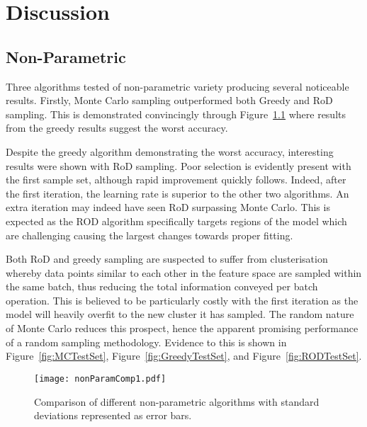 \chapter{Discussion}


\graphicspath{{Chapter5/Figs/Vector/}{Chapter5/Figs/}}


\section{Non-Parametric}
Three algorithms tested of non-parametric variety producing several noticeable results. Firstly, Monte Carlo sampling outperformed both Greedy and RoD sampling. This is demonstrated convincingly through Figure~\ref{fig:nPComp} where results from the greedy results suggest the worst accuracy.

Despite the greedy algorithm demonstrating the worst accuracy, interesting results were shown with RoD sampling. Poor selection is evidently present with the first sample set, although rapid improvement quickly follows. Indeed, after the first iteration, the learning rate is superior to the other two algorithms. An extra iteration may indeed have seen RoD surpassing Monte Carlo. This is expected as the ROD algorithm specifically targets regions of the model which are challenging causing the largest changes towards proper fitting.

Both RoD and greedy sampling are suspected to suffer from clusterisation whereby data points similar to each other in the feature space are sampled within the same batch, thus reducing the total information conveyed per batch operation. This is believed to be particularly costly with the first iteration as the model will heavily overfit to the new cluster it has sampled. The random nature of Monte Carlo reduces this prospect, hence the apparent promising performance of a random sampling methodology. Evidence to this is shown in Figure~\ref{fig:MCTestSet}, Figure~\ref{fig:GreedyTestSet}, and Figure~\ref{fig:RODTestSet}.

\begin{figure}[h]
    \begin{center}
        \texttt{[image: nonParamComp1.pdf]}
        \caption[Non-parametric comparison]{Comparison of different non-parametric algorithms with standard deviations represented as error bars.}
        \label{fig:nPComp}
    \end{center}
\end{figure}

